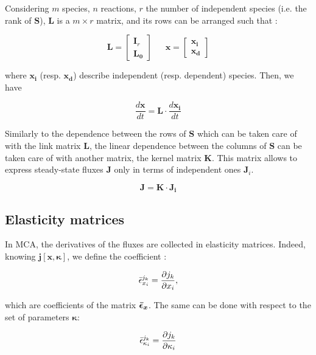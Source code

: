 \documentclass{article}
\begin{document}
	Considering $m$ species, $n$ reactions, $r$ the number of independent species (i.e. the rank of $\mathbf{S}$), $\mathbf{L}$ is a $m \times r$ matrix, and its rows can be arranged such that :
	\begin{center}
		\begin{equation}
			\mathbf{L}=\left[\begin{matrix}
				\mathbf{I}_r \\
				\mathbf{L_0}
			\end{matrix}\right] \ \ \ \ \ \ \  \mathbf{x}=\left[\begin{matrix}
				\mathbf{x_i} \\
				\mathbf{x_d}
			\end{matrix}\right]
		\end{equation}
	\end{center}
	where $\mathbf{x_i}$ (resp. $\mathbf{x_d}$) describe independent (resp. dependent) species. Then, we have 
	\begin{center}
		\begin{equation}
			\frac{d \mathbf{x}}{d t} = \mathbf{L} \cdot \frac{d \mathbf{x_i}}{d t}
			\label{27}
		\end{equation}
	\end{center}
	
	Similarly to the dependence between the rows of $\mathbf{S}$ which can be taken care of with the link matrix $\mathbf{L}$, the linear dependence between the columns of $\mathbf{S}$ can be taken care of with another matrix, the kernel matrix $\mathbf{K}$. This matrix allows to express steady-state fluxes $\mathbf{J}$ only in terms of independent ones $\mathbf{J}_i$. 
	\begin{center}
		\begin{equation}
			\mathbf{J} = \mathbf{K} \cdot \mathbf{J_i}
		\end{equation}
	\end{center}
	
	\subsection*{Elasticity matrices}
	In MCA, the derivatives of the fluxes are collected in elasticity matrices. Indeed, knowing $\mathbf{j} [\mathbf{x}, \pmb{\kappa}]$, we define the coefficient :
	\begin{center}
		\begin{equation}
			\Bar{\epsilon}^{j_k}_{x_i} = \frac{\partial j_k}{\partial x_i}, 
			\label{29}
		\end{equation}
	\end{center}
	which are coefficients of the matrix $\bm{\Bar{\epsilon}_x}$. The same can be done with respect to the set of parameters $\pmb{\kappa}$:
	\begin{center}
		\begin{equation}        \Bar{\epsilon}^{j_k}_{\kappa_i} = \frac{\partial j_k}{\partial \kappa_i}
			\label{30}
		\end{equation}
	\end{center}
	
\end{document}
